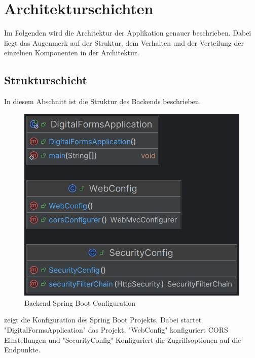 \chapter{Architekturschichten}\label{ch:arrchitekturschichten}
Im Folgenden wird die Architektur der Applikation genauer beschrieben. Dabei liegt das Augenmerk 
auf der Struktur, dem Verhalten und der Verteilung der einzelnen Komponenten in der Architektur.


\section{Strukturschicht}\label{sec:strukturschicht}

In diesem Abschnitt ist die Struktur des Backends beschrieben.

\begin{figure}[H]
    \centering
    \includegraphics[width=15cm]{images/classDiagrams/Config}
    \caption{Backend Spring Boot Configuration}\label{fig:Backend-Spring-Boot-Configuration}
\end{figure}

 zeigt die Konfiguration des Spring Boot Projekts.
Dabei startet "DigitalFormsApplication" das Projekt, "WebConfig" konfiguriert CORS Einstellungen und "SecurityConfig"
Konfiguriert die Zugriffsoptionen auf die Endpunkte.

